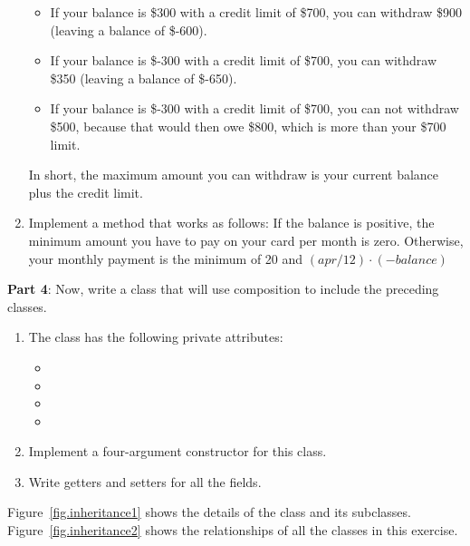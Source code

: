 \begin{exercise}
\begin{enumerate}
\begin{itemize}
\item If your balance is \$300 with a credit limit of \$700, you can withdraw \$900 (leaving a balance of \$-600).
\item If your balance is \$-300 with a credit limit of \$700, you can withdraw \$350 (leaving a balance of \$-650).
\item If your balance is \$-300 with a credit limit of \$700, you can not withdraw \$500, because that would then owe \$800, which is more than your \$700 limit.
\end{itemize}

In short, the maximum amount you can withdraw is your current balance plus the credit limit.

\item Implement a  method that works as follows: If the balance is positive, the minimum amount you have to pay on your card per month is zero. Otherwise, your monthly payment is the minimum of 20 and $(apr/12) \cdot (−balance)$

\end{enumerate}

{\bf Part 4}: Now, write a  class that will use composition to include the preceding classes.

\begin{enumerate}
\item The  class has the following private attributes:

\begin{itemize}
\item {}
\item {}
\item {}
\item {}
\end{itemize}

\item Implement a four-argument constructor for this class.

\item Write getters and setters for all the fields.
\end{enumerate}

Figure~\ref{fig.inheritance1} shows the details of the  class and its subclasses. Figure~\ref{fig.inheritance2} shows the relationships of all the classes in this exercise.


\end{exercise}
